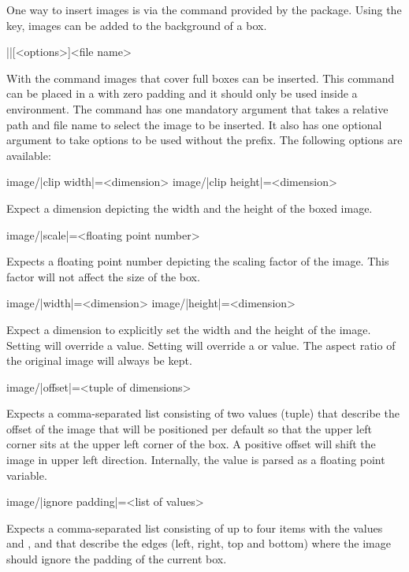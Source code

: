 \documentclass[a4paper]{article}
\begin{document}
One way to insert images is via the  command provided by the  package. Using the  key, images can be added to the background of a box.

\begin{macrodef}
|\leporelloimage|[<options>]{<file name>}
\end{macrodef}
With the command \macro{\leporelloimage} images that cover full boxes can be inserted. This command can be placed in a  with zero padding and it should only be used inside a  environment. The command has one mandatory argument that takes a relative path and file name to select the image to be inserted. It also has one optional argument to take options to be used without the  prefix. The following options are available:

\begin{macrodef}
image/|clip width|={<dimension>}
image/|clip height|={<dimension>}
\end{macrodef}
Expect a dimension depicting the width and the height of the boxed image.

\begin{macrodef}
image/|scale|={<floating point number>}
\end{macrodef}
Expects a floating point number depicting the scaling factor of the image. This factor will not affect the size of the box.

\begin{macrodef}
image/|width|={<dimension>}
image/|height|={<dimension>}
\end{macrodef}
Expect a dimension to explicitly set the width and the height of the image. Setting  will override a  value. Setting  will override a  or  value. The aspect ratio of the original image will always be kept.

\begin{macrodef}
image/|offset|={<tuple of dimensions>}
\end{macrodef}
Expects a comma-separated list consisting of two values (tuple) that describe the offset of the image that will be positioned per default so that the upper left corner sits at the upper left corner of the box. A positive offset will shift the image in upper left direction. Internally, the value is parsed as a floating point variable.

\begin{macrodef}
image/|ignore padding|={<list of values>}
\end{macrodef}
Expects a comma-separated list consisting of up to four items with the values  and ,  and  that describe the edges (left, right, top and bottom) where the image should ignore the padding of the current box.
\end{document}
